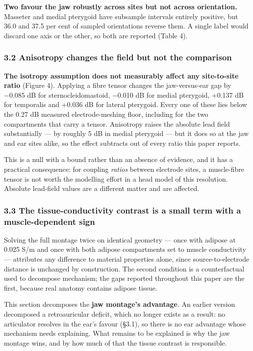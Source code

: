 \documentclass[
  11pt,
]{article}
\begin{document}
\textbf{Two favour the jaw robustly across sites but not across orientation.}
Masseter and medial pterygoid have subsample intervals entirely positive, but
36.0 and 37.5 per cent of sampled orientations reverse them. A single label
would discard one axis or the other, so both are reported (Table 4).

\subsubsection{3.2 Anisotropy changes the field but not the comparison}\label{anisotropy-changes-the-field-but-not-the-comparison}

\textbf{The isotropy assumption does not measurably affect any site-to-site ratio}
(Figure 4).
Applying a fibre tensor changes the jaw-versus-ear gap by −0.085 dB for
sternocleidomastoid, −0.010 dB for medial pterygoid, +0.137 dB for temporalis
and +0.036 dB for lateral pterygoid. Every one of these lies below the 0.27 dB
measured electrode-meshing floor, including for the two compartments that
carry a tensor. Anisotropy raises the absolute lead field substantially --- by
roughly 5 dB in medial pterygoid --- but it does so at the jaw and ear sites
alike, so the effect subtracts out of every ratio this paper reports.

This is a null with a bound rather than an absence of evidence, and it has a
practical consequence: for coupling \emph{ratios} between electrode sites, a
muscle-fibre tensor is not worth the modelling effort in a head model of this
resolution. Absolute lead-field values are a different matter and are affected.

\subsubsection{3.3 The tissue-conductivity contrast is a small term with a muscle-dependent sign}\label{the-tissue-conductivity-contrast-is-a-small-term-with-a-muscle-dependent-sign}

Solving the full montage twice on identical geometry --- once with adipose at
0.025 S/m and once with both adipose compartments set to muscle conductivity ---
attributes any difference to material properties alone, since source-to-electrode
distance is unchanged by construction. The second condition is a counterfactual
used to decompose mechanism; the gaps reported throughout this paper are the
first, because real anatomy contains adipose tissue.

This section decomposes the \textbf{jaw montage's advantage}. An earlier version
decomposed a retroauricular deficit, which no longer exists as a result: no
articulator resolves in the ear's favour (§3.1), so there is no ear advantage
whose mechanism needs explaining. What remains to be explained is why the jaw
montage wins, and by how much of that the tissue contrast is responsible.
\end{document}
